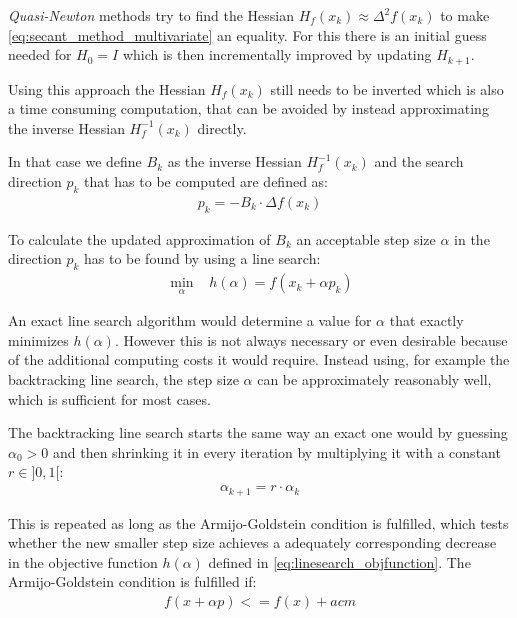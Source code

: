 \textit{Quasi-Newton} methods try to find the Hessian $H_f(x_k)\approx \Delta^2f(x_k)$ to make \eqref{eq:secant_method_multivariate} an equality. For this there is an initial guess needed for $H_0 = I$ which is then incrementally improved by updating $H_{k+1}$.

Using this approach the Hessian $H_f(x_k)$ still needs to be inverted which is also a time consuming computation, that can be avoided by instead approximating the inverse Hessian $H_f^{-1}(x_k)$ directly. 

In that case we define $B_k$ as the inverse Hessian $H_f^{-1}(x_k)$ and the search direction $p_k$ that has to be computed are defined as:
\begin{equation}\label{eq:searchdirection}
	\begin{array}{lc}
		p_k = -B_k \cdot \Delta f(x_k)
	\end{array}
\end{equation}

To calculate the updated approximation of $B_k$ an acceptable step size $\alpha$ in the direction $p_k$ has to be found by using a line search:
\begin{equation}\label{eq:linesearch_objfunction}
	\begin{array}{lc}
		\displaystyle \min_\alpha \;\;\; h(\alpha) = f(x_k + \alpha p_k)
	\end{array}
\end{equation}

An exact line search algorithm would determine a value for $\alpha$ that exactly minimizes $h(\alpha)$. However this is not always necessary or even desirable because of the additional computing costs it would require. 
Instead using, for example the backtracking line search, the step size $\alpha$ can be approximately reasonably well, which is sufficient for most cases.

The backtracking line search starts the same way an exact one would by guessing $\alpha_0 > 0$ and then shrinking it in every iteration by multiplying it with a constant $r \in ]0,1[$:
\begin{equation}\label{eq:linesearch_ak}
	\begin{array}{lc}
		\alpha_{k+1} = r \cdot \alpha_k
	\end{array}
\end{equation}

This is repeated as long as the Armijo-Goldstein condition is fulfilled, which tests whether the new smaller step size  achieves a adequately corresponding decrease in the objective function $h(\alpha)$ defined in \eqref{eq:linesearch_objfunction}.
The Armijo-Goldstein condition is fulfilled if:
\begin{equation}\label{eq:linesearch_armijo-goldstein}
	\begin{array}{lc}
		f(x+\alpha p) <= f(x) + a c m
	\end{array}
\end{equation}

